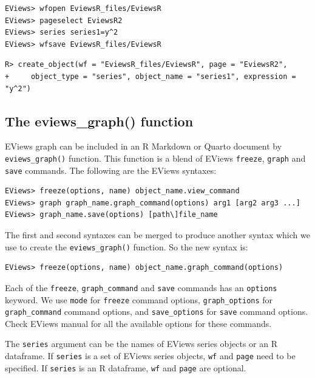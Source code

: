 \begin{verbatim}
EViews> wfopen EviewsR_files/EviewsR
EViews> pageselect EviewsR2
EViews> series series1=y^2
EViews> wfsave EviewsR_files/EviewsR
\end{verbatim}

\begin{verbatim}
R> create_object(wf = "EviewsR_files/EviewsR", page = "EviewsR2",
+     object_type = "series", object_name = "series1", expression = "y^2")
\end{verbatim}

\hypertarget{sec-figures}{%
\subsection{The eviews\_graph() function}\label{sec-figures}}

EViews graph can be included in an R Markdown or Quarto document by \texttt{eviews\_graph()} function. This function is a blend of EViews \texttt{freeze}, \texttt{graph} and \texttt{save} commands. The following are the EViews syntaxes:

\begin{verbatim}
EViews> freeze(options, name) object_name.view_command
EViews> graph graph_name.graph_command(options) arg1 [arg2 arg3 ...]
EViews> graph_name.save(options) [path\]file_name
\end{verbatim}

The first and second syntaxes can be merged to produce another syntax which we use to create the \texttt{eviews\_graph()} function. So the new syntax is:

\begin{verbatim}
EViews> freeze(options, name) object_name.graph_command(options)
\end{verbatim}

Each of the \texttt{freeze}, \texttt{graph\_command} and \texttt{save} commands has an \texttt{options} keyword. We use \texttt{mode} for \texttt{freeze} command options, \texttt{graph\_options} for \texttt{graph\_command} command options, and \texttt{save\_options} for \texttt{save} command options. Check EViews manual for all the available options for these commands.

The \texttt{series} argument can be the names of EViews series objects or an R dataframe. If \texttt{series} is a set of EViews series objects, \texttt{wf} and \texttt{page} need to be specified. If \texttt{series} is an R dataframe, \texttt{wf} and \texttt{page} are optional.

